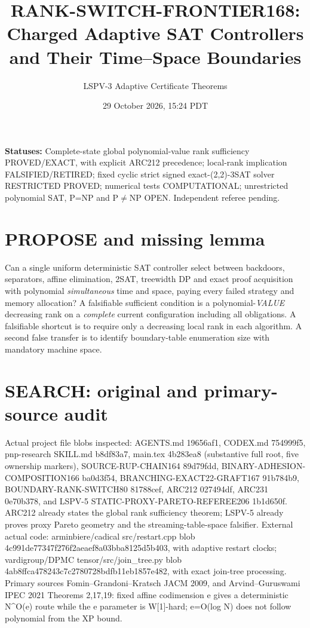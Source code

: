 \documentclass[11pt]{article}
\title{RANK-SWITCH-FRONTIER168: Charged Adaptive SAT Controllers and Their Time--Space Boundaries}
\author{LSPV-3 Adaptive Certificate Theorems}
\date{29 October 2026, 15:24 PDT}
\begin{document}
\maketitle
\noindent\textbf{Statuses:} Complete-state global polynomial-value rank sufficiency PROVED/EXACT, with explicit ARC212 precedence; local-rank implication FALSIFIED/RETIRED; fixed cyclic strict signed exact-(2,2)-3SAT solver RESTRICTED PROVED; numerical tests COMPUTATIONAL; unrestricted polynomial SAT, P=NP and P$\ne$NP OPEN. Independent referee pending.
\section{PROPOSE and missing lemma}
Can a single uniform deterministic SAT controller select between backdoors, separators, affine elimination, 2SAT, treewidth DP and exact proof acquisition with polynomial \emph{simultaneous} time and space, paying every failed strategy and memory allocation? A falsifiable sufficient condition is a polynomial-\emph{VALUE} decreasing rank on a \emph{complete} current configuration including all obligations. A falsifiable shortcut is to require only a decreasing local rank in each algorithm. A second false transfer is to identify boundary-table enumeration size with mandatory machine space.
\section{SEARCH: original and primary-source audit}
Actual project file blobs inspected: AGENTS.md 19656af1, CODEX.md 754999f5, pnp-research SKILL.md b8df83a7, main.tex 4b283ea8 (substantive full root, five ownership markers), SOURCE-RUP-CHAIN164 89d79fdd, BINARY-ADHESION-COMPOSITION166 ba0d3f54, BRANCHING-EXACT22-GRAFT167 91b784b9, BOUNDARY-RANK-SWITCH80 81788cef, ARC212 027494df, ARC231 0e70b378, and LSPV-5 STATIC-PROXY-PARETO-REFEREE206 1b1d650f. ARC212 already states the global rank sufficiency theorem; LSPV-5 already proves proxy Pareto geometry and the streaming-table-space falsifier. External actual code: arminbiere/cadical src/restart.cpp blob 4c991de77347f276f2aeaef8a03bba8125d5b403, with adaptive restart clocks; vardigroup/DPMC tensor/src/join_tree.py blob 4ab8ffca478243c7c2780728bdfb11eb1857e482, with exact join-tree processing. Primary sources Fomin--Grandoni--Kratsch JACM 2009, and Arvind--Guruswami IPEC 2021 Theorems 2,17,19: fixed affine codimension e gives a deterministic N^{O(e)} route while the e parameter is W[1]-hard; e=O(log N) does not follow polynomial from the XP bound.
\end{document}
